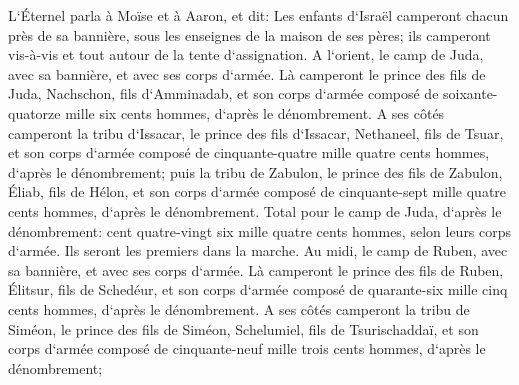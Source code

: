 \verse L`Éternel parla à Moïse et à Aaron, et dit: 
\verse Les enfants d`Israël camperont chacun près de sa bannière, sous les enseignes de la maison de ses pères; ils camperont vis-à-vis et tout autour de la tente d`assignation. 
\verse A l`orient, le camp de Juda, avec sa bannière, et avec ses corps d`armée. Là camperont le prince des fils de Juda, Nachschon, fils d`Amminadab, 
\verse et son corps d`armée composé de soixante-quatorze mille six cents hommes, d`après le dénombrement. 
\verse A ses côtés camperont la tribu d`Issacar, le prince des fils d`Issacar, Nethaneel, fils de Tsuar, 
\verse et son corps d`armée composé de cinquante-quatre mille quatre cents hommes, d`après le dénombrement; 
\verse puis la tribu de Zabulon, le prince des fils de Zabulon, Éliab, fils de Hélon, 
\verse et son corps d`armée composé de cinquante-sept mille quatre cents hommes, d`après le dénombrement. 
\verse Total pour le camp de Juda, d`après le dénombrement: cent quatre-vingt six mille quatre cents hommes, selon leurs corps d`armée. Ils seront les premiers dans la marche. 
\verse Au midi, le camp de Ruben, avec sa bannière, et avec ses corps d`armée. Là camperont le prince des fils de Ruben, Élitsur, fils de Schedéur, 
\verse et son corps d`armée composé de quarante-six mille cinq cents hommes, d`après le dénombrement. 
\verse A ses côtés camperont la tribu de Siméon, le prince des fils de Siméon, Schelumiel, fils de Tsurischaddaï, 
\verse et son corps d`armée composé de cinquante-neuf mille trois cents hommes, d`après le dénombrement; 
